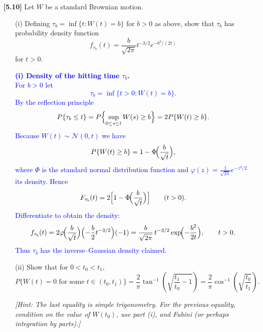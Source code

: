 \documentclass{article}
\begin{document}
\textbf{[5.10]} Let $W$ be a standard Brownian motion.

\begin{enumerate}
    \item[(i)] Defining $\tau_b = \inf\{t : W(t) = b\}$ for $b > 0$ as above, show that $\tau_b$ has probability density function
    \[
    f_{\tau_b}(t) = \frac{b}{\sqrt{2\pi}} t^{-3/2} e^{-b^2/(2t)}
    \]
    for $t > 0$.

    \textcolor{blue}{
\textbf{(i) Density of the hitting time $\tau_b$. \\}
For $b>0$ let  
$$
\tau_b=\inf\{t>0:W(t)=b\}.
$$
By the reflection principle
$$
P\{\tau_b\le t\}=P\Bigl\{\sup_{0\le s\le t}W(s)\ge b\Bigr\}=2P\{W(t)\ge b\}.
$$
Because $W(t)\sim\mathcal N(0,t)$ we have  
$$
P\{W(t)\ge b\}=1-\Phi\!\Bigl(\frac{b}{\sqrt t}\Bigr),
$$
where $\Phi$ is the standard normal distribution function and $\varphi(z)=\frac1{\sqrt{2\pi}}e^{-z^{2}/2}$ its density.  Hence  
$$
F_{\tau_b}(t)=2\Bigl[1-\Phi\!\Bigl(\frac{b}{\sqrt t}\Bigr)\Bigr]
\qquad(t>0).
$$
Differentiate to obtain the density:
$$
f_{\tau_b}(t)=2\varphi\!\Bigl(\frac{b}{\sqrt t}\Bigr)\Bigl(-\frac{b}{2}t^{-3/2}\Bigr)(-1)
              =\frac{b}{\sqrt{2\pi}}\,t^{-3/2}\exp\!\Bigl(-\frac{b^{2}}{2t}\Bigr),
\qquad t>0.
$$
Thus $\tau_b$ has the inverse–Gaussian density claimed.
    }
    
    \item[(ii)] Show that for $0 < t_0 < t_1$,
    \[
    P\{W(t) = 0 \text{ for some } t \in (t_0, t_1)\} = \frac{2}{\pi} \tan^{-1} \left( \sqrt{\frac{t_1}{t_0} - 1} \right) = \frac{2}{\pi} \cos^{-1} \left( \sqrt{\frac{t_0}{t_1}} \right).
    \]
    
    \textit{[Hint: The last equality is simple trigonometry. For the previous equality, condition on the value of $W(t_0)$, use part (i), and Fubini (or perhaps integration by parts).]}


\end{enumerate}
\end{document}
